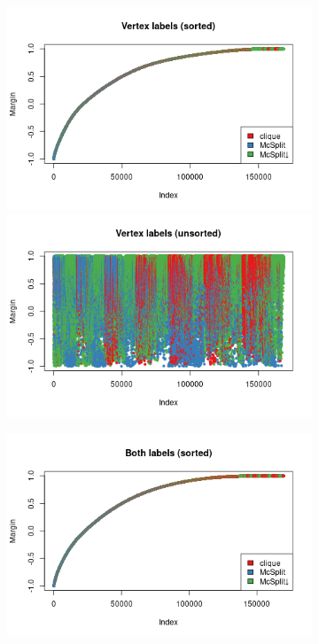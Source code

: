 \documentclass{l4proj}
\theoremstyle{definition}
\theoremstyle{remark}
\begin{document}
\begin{figure}
  \centering
  \begin{subfigure}[t]{0.49\textwidth}
    \centering
    \includegraphics[width=\textwidth]{images/vertex_labels_margin.png}
    \includegraphics[width=\textwidth]{images/vertex_labels_margin2.png}
  \end{subfigure}
  \begin{subfigure}[t]{0.49\textwidth}
    \centering
    \includegraphics[width=\textwidth]{images/both_labels_margin.png}

\end{subfigure}
\end{figure}
\end{document}

